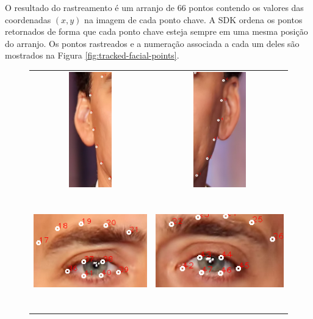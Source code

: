 O resultado do rastreamento é um arranjo de 66 pontos contendo os valores das coordenadas $(x,y)$ na imagem de cada ponto chave. A SDK ordena os pontos retornados de forma que cada ponto chave esteja sempre em uma mesma posição do arranjo. Os pontos rastreados e a numeração associada a cada um deles são mostrados na  Figura \ref{fig:tracked-facial-points}. 

\begin{figure}
\centering
\begin{tabular}{cc}
\includegraphics[width=0.4\linewidth, height=5cm]{figs/nick-marked-l-ear.png} &
\includegraphics[width=0.4\linewidth, height=5cm]{figs/nick-marked-r-ear.png} \\
\includegraphics[width=0.4\linewidth, height=5cm]{figs/nick-marked-l-eye.png} &
\includegraphics[width=0.4\linewidth, height=5cm]{figs/nick-marked-r-eye.png} \\

\end{tabular}
\end{figure}
